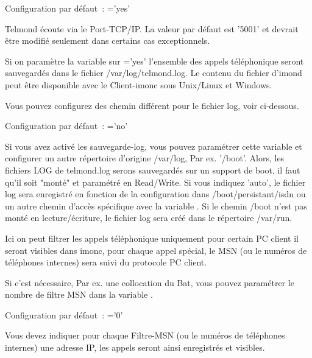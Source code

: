 Configuration par défaut~: ='yes'

\begin{description}

  Telmond écoute via le Port-TCP/IP. La valeur par défaut est '5001' et devrait
  être modifié seulement dans certains cas exceptionnels.


  Si on paramètre la variable sur ='yes' l'ensemble des appels
  téléphonique seront sauvegardés dans le fichier /var/log/telmond.log. Le contenu
  du fichier d'imond peut être disponible avec le Client-imonc sous Unix/Linux
  et Windows.

  Vous pouvez configurez des chemin différent pour le fichier log, voir ci-dessous.

  Configuration par défaut~: ='no'


  Si vous avez activé les sauvegarde-log, vous pouvez paramétrer cette variable
   et configurer un autre répertoire d'origine /var/log, Par ex.
  '/boot'. Alors, les fichiers LOG de telmond.log serons sauvegardés sur un
  support de boot, il faut qu'il soit "monté" et paramétré en Read/Write.
  Si vous indiquez 'auto', le fichier log sera enregistré en fonction de la
  configuration dans /boot/persistant/isdn ou un autre chemin d'accès spécifique
  avec la variable . Si le chemin /boot n'est pas monté en
  lecture/écriture, le fichier log sera créé dans le répertoire /var/run.


  Ici on peut filtrer les appels téléphonique uniquement pour certain PC client
  il seront visibles dans imonc, pour chaque appel spécial, le MSN (ou le numéros
  de téléphones internes) sera suivi du protocole PC client.

  Si c'est nécessaire, Par ex. une collocation du Bat, vous pouvez paramétrer le
  nombre de filtre MSN dans la variable .

  Configuration par défaut~: ='0'


  Vous devez indiquer pour chaque Filtre-MSN (ou le numéros de téléphones internes)
  une adresse IP, les appels seront ainsi enregistrés et visibles.


\end{description}

